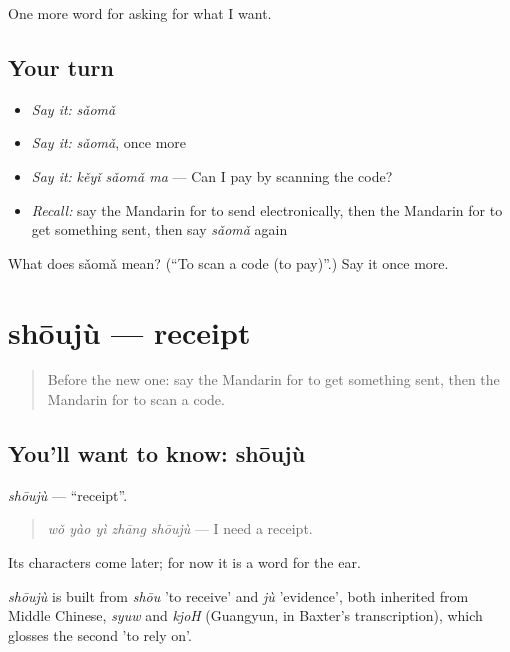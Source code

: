 \begin{grammarlens}[title={What you've built}]
One more word for asking for what I want.
\end{grammarlens}

\subsection*{Your turn}
\begin{itemize}
\raggedright
  \item \emph{Say it:} \emph{sǎomǎ}
  \item \emph{Say it:} \emph{sǎomǎ}, once more
  \item \emph{Say it:} \emph{kěyǐ sǎomǎ ma} — Can I pay by scanning the code?
  \item \emph{Recall:} say the Mandarin for to send electronically, then the Mandarin for to get something sent, then say \emph{sǎomǎ} again
\end{itemize}

\begin{tcolorbox}[breakable,colback=teal!4,colframe=teal!35!black,title={Before you move on}]
What does sǎomǎ mean? (\textquotedblleft{}To scan a code (to pay)\textquotedblright{}.) Say it once more.
\end{tcolorbox}
\section[shōujù]{shōujù — receipt}

\label{lesson:ZH-C202-shouju}



\begin{quote}
Before the new one: say the Mandarin for to get something sent, then the Mandarin for to scan a code.
\end{quote}

\subsection*{You'll want to know: shōujù}
\emph{shōujù} — \textquotedblleft{}receipt\textquotedblright{}.

\begin{quote}
\emph{wǒ yào yì zhāng shōujù} — I need a receipt.
\end{quote}

Its characters come later; for now it is a word for the ear.

\begin{cousinweb}
\emph{shōujù} is built from \emph{shōu} 'to receive' and \emph{jù} 'evidence', both inherited from Middle Chinese, \emph{syuw} and \emph{kjoH} (Guangyun, in Baxter's transcription), which glosses the second 'to rely on'.
\end{cousinweb}

